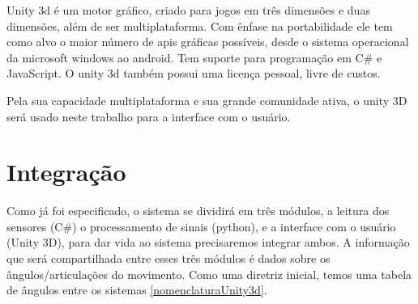   Unity 3d é um motor gráfico, criado para jogos em três dimensões e duas dimensões, além de ser
multiplataforma. Com ênfase na portabilidade ele tem como alvo o maior número
de apis gráficas possíveis, desde o sistema operacional da microsoft windows 
ao android.  Tem suporte para programação em C\# e JavaScript. O unity 3d também
 possui uma licença pessoal, livre de custos.

  Pela sua capacidade multiplataforma e sua grande comunidade ativa, o unity 3D
será usado neste trabalho para a interface com o usuário.
  
\section{Integração}
\label{Sec:Integração}

  Como já foi especificado, o sistema se dividirá em três módulos, a leitura dos sensores (C\#) o processamento
de sinais (python), e a interface com o usuário (Unity 3D), para dar vida ao sistema
precisaremos integrar ambos. A informação que será compartilhada entre esses três
módulos é dados sobre os ângulos/articulações do movimento. Como uma diretriz inicial,
 temos uma tabela de ângulos entre os sistemas \ref{nomenclaturaUnity3d}.


